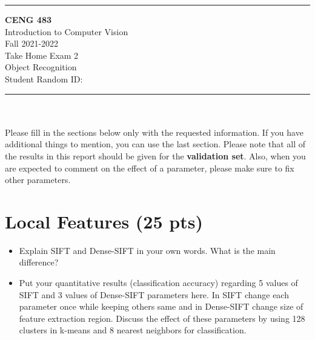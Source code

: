 \documentclass[12pt]{article}
\newcommand{\HRule}{\rule{\linewidth}{1mm}}
\begin{document}
\noindent
\HRule %
\small
\begin{center}
    \LARGE \textbf{CENG 483} \\[4mm]
    \Large Introduction to Computer Vision \\[4mm]
    \normalsize Fall 2021-2022 \\
    \Large Take Home Exam 2 \\
    \Large Object Recognition \\
    \Large Student Random ID: \\
\end{center}
\HRule

\begin{center}
\end{center}
\vspace{-10mm}
\noindent\\ \\ 
Please fill in the sections below only with the requested information. If you have additional things to mention, you can use the last section. Please note that all of the results in this report should be given for the \textbf{validation set}. Also, when you are expected to comment on the effect of a parameter, please make sure to fix other parameters.

\section{Local Features (25 pts)}
    \begin{itemize}
        \item Explain SIFT and Dense-SIFT in your own words. What is the main difference?
        
        \item Put your quantitative results (classification accuracy) regarding 5 values of SIFT and 3 values of Dense-SIFT parameters here. In SIFT change each parameter once while keeping others same and in Dense-SIFT change size of feature extraction region. Discuss the effect of these parameters by using 128 clusters in k-means and 8 nearest neighbors for classification.
        
    \end{itemize}
    
\end{document}
